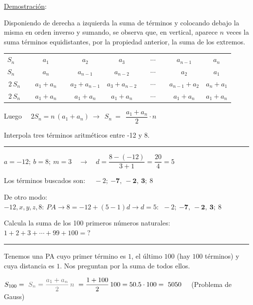 \underline{Demostración}:

Disponiendo de derecha a izquierda la suma de términos y colocando debajo la misma en orden inverso y sumando, se observa que, en vertical, aparece $n$ veces la suma términos equidistantes, por la propiedad anterior, la suma de los extremos.

\begin{table}[H]
\centering
\begin{tabular}{c|cccccc}
$S_n \quad $ & $a_1$ & $a_2$ & $a_3$ & $\quad  \cdots \quad $ & $a_{n-1}$ & $a_n$ \\
$S_n \quad  $ & $a_n$ & $a_{n-1}$ & $a_{n-2}$ & $\cdots$ & $a_2$ & $a_1$ \\ \hline
$2\, S_n$ & $\quad a_1+a_n \quad $ & $a_2+a_{n-1}$ & $a_3+a_{n-2}$ & $\cdots$ & $a_{n-1}+a_2$ & $a_n+a_1$ \\ \hline
$2\, S_n$ & $\quad a_1+a_n \quad $ & $a_1+a_n$ & $a_1+a_n$ & $\cdots$ & $a_1+a_n$ & $a_1+a_n$
\end{tabular}
\end{table}

Luego $\quad 2S_n = n\, (a_1+a_n) \ \to \ \ S_n\ = \ \ \dfrac{a_1+a_n}{2}\cdot n$\QED

\vspace{5mm}

\begin{miejercicio}

Interpola tres términos aritméticos entre -12 y 8.

\rule{250pt}{0.1pt}
\vspace{2mm}

$a=-12;\ b=8;\ m=3 \quad \to \quad d=\dfrac{8-(-12)}{3+1}=\dfrac{20}{4}=5$

\vspace{2mm} Los términos buscados son: $\quad -2;\ \boldsymbol{-7, \ -2, \ 3}  ; \ 8$	

\vspace{2mm}\begin{small} \textcolor{gris}{De otro modo: $-12,x,y,z,8:\ PA \to 8=-12+(5-1)d \to d= 5:\ \  -2;\ \boldsymbol{-7, \ -2, \ 3}  ; \ 8 $} \end{small}
\end{miejercicio}

\begin{miejercicio}

\normalsize{Calcula} la suma de los 100 primeros números naturales:
$1+2+3+\cdots +99+100=?$
\rule{250pt}{0.1pt}	

Tenemos una PA cuyo primer término es $1$, el último $100$ (hay $100$ términos) y cuya distancia es $1$. Nos preguntan por la suma de todos ellos.

\vspace{2mm} $S_{100} =\  \textcolor{gris}{S_n=\dfrac{a_1+a_n}{2}\, n} \ = \dfrac{1+100}{2}\, 100= 50.5\cdot 100=\ 5050 \quad $ \textcolor{gris}{(Problema de Gauss)}
\end{miejercicio}


